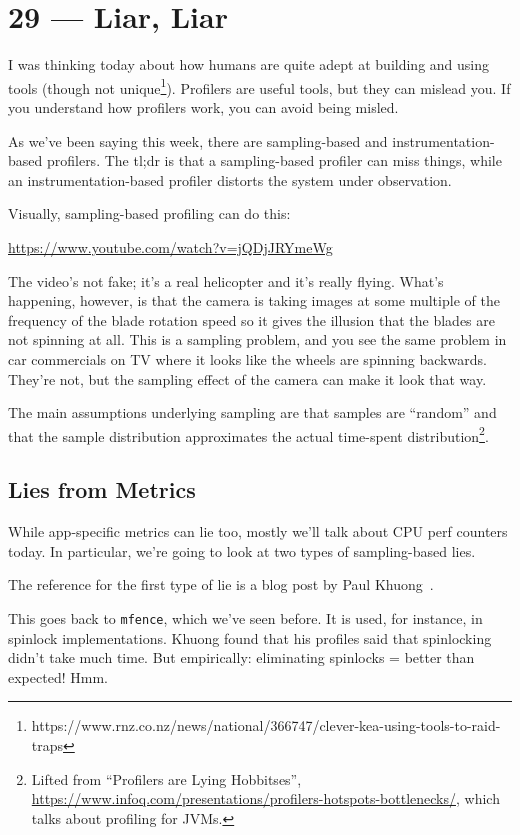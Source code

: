 \documentclass[a4paper]{report}
\begin{document}
\chapter*{29 --- Liar, Liar}


I was thinking today about how humans are quite adept at building and
using tools (though not
unique\footnote{https://www.rnz.co.nz/news/national/366747/clever-kea-using-tools-to-raid-traps}). Profilers
are useful tools, but they can mislead you.  If you understand how
profilers work, you can avoid being misled.

As we've been saying this week, there are sampling-based and instrumentation-based profilers.
The tl;dr is that a sampling-based profiler can miss things, while an instrumentation-based
profiler distorts the system under observation.

Visually, sampling-based profiling can do this:
\begin{center}
	\url{https://www.youtube.com/watch?v=jQDjJRYmeWg}
\end{center}

The video's not fake; it's a real helicopter and it's really flying. What's happening, however, is that the camera is taking images at some multiple of the frequency of the blade rotation speed so it gives the illusion that the blades are not spinning at all. This is a sampling problem, and you see the same problem in car commercials on TV where it looks like the wheels are spinning backwards. They're not, but the sampling effect of the camera can make it look that way.

The main assumptions underlying sampling are that samples are ``random'' and that the sample distribution approximates the actual time-spent distribution\footnote{Lifted from ``Profilers are Lying Hobbitses'', \url{https://www.infoq.com/presentations/profilers-hotspots-bottlenecks/}, which talks about profiling for JVMs.}.

\section*{Lies from Metrics}
While app-specific metrics can lie too, mostly we'll talk about CPU
perf counters today.
In particular, we're going to look at two types of sampling-based lies.

The reference for the first type of lie is a blog post by Paul Khuong~\cite{metrics}.

This goes back to {\tt mfence}, which we've seen before. It is used, for instance, in
spinlock implementations. Khuong found that his profiles said that spinlocking didn't take much time.
But empirically: eliminating spinlocks = better than expected! Hmm.
\end{document}
